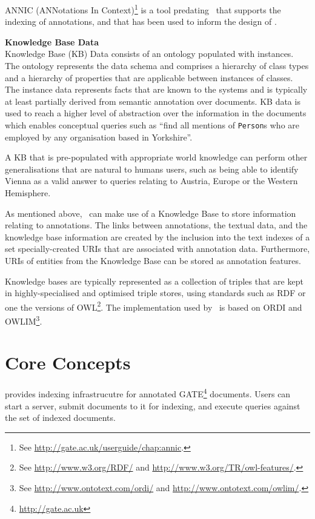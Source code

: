 ANNIC (ANNotations In
Context)\footnote{See \url{http://gate.ac.uk/userguide/chap:annic}.} is a tool
predating \Mimir\ that supports the indexing of annotations, and that has been
used to inform the design of \Mimir.

{\bf Knowledge Base Data}\\
Knowledge Base (KB) Data  consists of an ontology populated with instances. The
ontology represents the data schema and comprises a hierarchy of class types
and a hierarchy of properties that are applicable between instances of classes.
The instance data represents facts that are known to the systems and is
typically at least partially derived from semantic annotation over documents.
KB data is used to reach a higher level of abstraction over the information in
the documents which enables conceptual queries such as ``find all mentions of
{\tt Person}s who are employed by any organisation based in Yorkshire''.

A KB that is pre-populated with appropriate world knowledge can perform other
generalisations that are natural to humans users, such as being able to identify
Vienna as a valid answer to queries relating to Austria, Europe or the Western
Hemisphere.

As mentioned above, \Mimir\ can make use of a Knowledge Base to store
information relating to annotations. The links between annotations, the textual
data, and the knowledge base information are created by the inclusion into the
text indexes of a set specially-created URIs that are associated with
annotation data. Furthermore, URIs of entities from the Knowledge Base can be
stored as annotation features.

Knowledge bases are typically represented as a collection of triples that are
kept in highly-specialised and optimised triple stores, using standards such as
RDF or one the versions of OWL\footnote{See
\url{http://www.w3.org/RDF/} and \url{http://www.w3.org/TR/owl-features/}.}. The
implementation used by \Mimir\ is based on ORDI and
OWLIM\footnote{See
\url{http://www.ontotext.com/ordi/} and \url{http://www.ontotext.com/owlim/}.}.

\section{Core Concepts}

\Mimir{} provides indexing infrastrucutre for annotated
GATE\footnote{\url{http://gate.ac.uk}} documents. Users can start a \Mimir{}
server, submit documents to it for indexing, and execute queries against the set
of indexed documents. 

